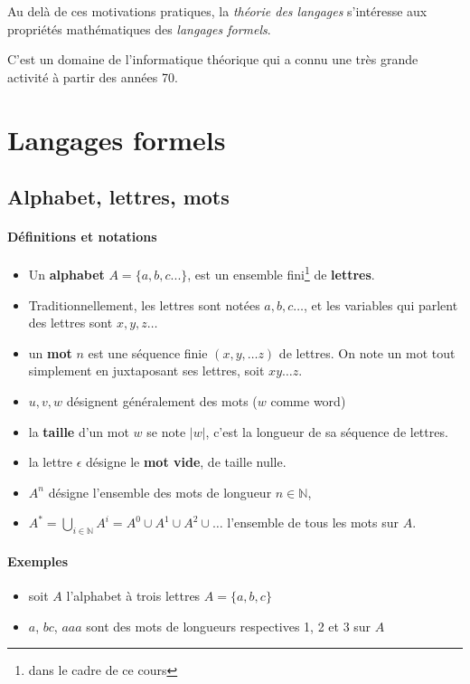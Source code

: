 \documentclass[10pt,twoside]{article}
\providecommand{\abs}[1]{|#1|}
\begin{document}
Au delà de ces motivations pratiques, 
la \emph{théorie des langages} s'intéresse aux propriétés
mathématiques
des \emph{langages formels}.

C'est un domaine de l'informatique théorique
qui a connu une très grande activité à partir des années
70.

\section{Langages formels}

\subsection{Alphabet, lettres, mots}

\paragraph{Définitions et notations}

\begin{itemize}
\item
Un \textbf{alphabet} $A = \{a, b, c ...\}$,
est un ensemble fini\footnote{dans le cadre de ce cours}
de \textbf{lettres}.
\item
Traditionnellement, les lettres sont notées $a, b, c \ldots$,
et les variables qui parlent des lettres sont $x, y, z \ldots $
\item un \textbf{mot} $n$ est une séquence finie 
$(x, y, \ldots z)$ de lettres. On note un mot tout simplement en juxtaposant
ses lettres, soit $x y \ldots z$. 
\item $u, v, w$ désignent généralement des mots ($w$ comme word)
\item la \textbf{taille} d'un mot $w$ se note $\abs{w}$, c'est la 
longueur de sa séquence de lettres.
\item la lettre $\epsilon$ désigne le \textbf{mot vide}, de taille nulle. 
\item $A^n $
 désigne l'ensemble des mots de longueur $n \in \mathbb{N}$, 
\item $A^* = \bigcup_{i \in \mathbb{N}} A^i
=  A^0 \cup A^1 \cup A^2 \cup \ldots$ l'ensemble de tous les mots  sur  $A$.
\end{itemize}

\paragraph{Exemples} 

\begin{itemize}
\item soit $A$ l'alphabet à trois lettres $A = \{ a, b, c \}$
\item $a$, $bc$, $aaa$ sont des mots de longueurs 
respectives 1, 2 et 3 sur $A$
\end{itemize}
\end{document}
